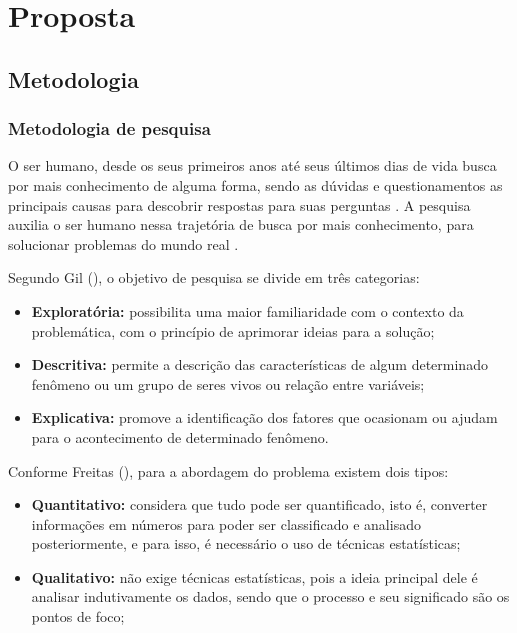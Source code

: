 \chapter{Proposta}
\label{proposta}
\section{Metodologia}

\subsection{Metodologia de pesquisa}

O ser humano, desde os seus primeiros anos até seus últimos dias de vida busca por mais conhecimento de alguma forma, sendo as dúvidas e questionamentos as principais causas para descobrir respostas para suas perguntas \cite{Paschoarelli_Medola_Bonfim_2018}. A pesquisa auxilia o ser humano nessa trajetória de busca por mais conhecimento, para solucionar problemas do mundo real \cite{gil:2008}.

Segundo Gil (\citeyear{gil:2002}), o objetivo de pesquisa se divide em três categorias:

\begin{itemize}
    \item \textbf{Exploratória:} possibilita uma maior familiaridade com o contexto da problemática, com o princípio de aprimorar ideias para a solução;
    
    \item \textbf{Descritiva:} permite a descrição das características de algum determinado fenômeno ou um grupo 
    de seres vivos ou relação entre variáveis;
    
    \item \textbf{Explicativa:} promove a identificação dos fatores que ocasionam ou ajudam para o acontecimento de determinado fenômeno.

\end{itemize}

Conforme Freitas (\citeyear{de2013metodologia}), para a abordagem do problema existem dois tipos:

\begin{itemize}
    \item \textbf{Quantitativo:} considera que tudo pode ser quantificado, isto é, converter informações em números para poder ser classificado e analisado posteriormente, e para isso, é necessário o uso de técnicas estatísticas;
    
    \item \textbf{Qualitativo:} não exige técnicas estatísticas, pois a ideia principal dele é analisar indutivamente os dados, sendo que o processo e seu significado são os pontos de foco;
\end{itemize}


